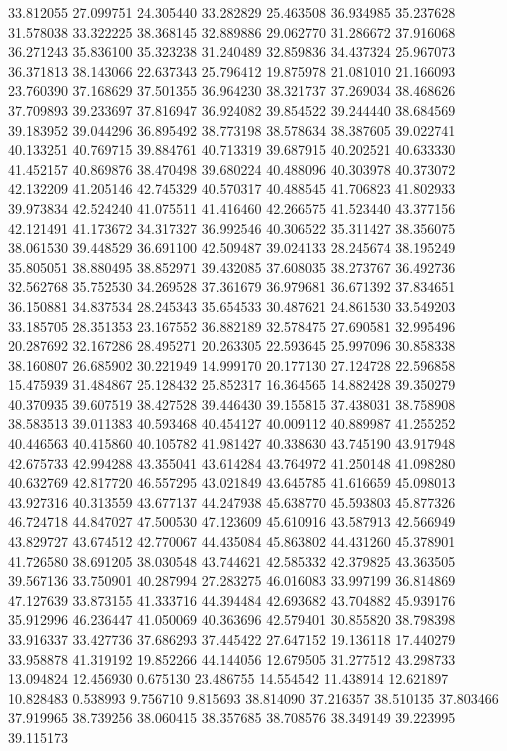 33.812055
27.099751
24.305440
33.282829
25.463508
36.934985
35.237628
31.578038
33.322225
38.368145
32.889886
29.062770
31.286672
37.916068
36.271243
35.836100
35.323238
31.240489
32.859836
34.437324
25.967073
36.371813
38.143066
22.637343
25.796412
19.875978
21.081010
21.166093
23.760390
37.168629
37.501355
36.964230
38.321737
37.269034
38.468626
37.709893
39.233697
37.816947
36.924082
39.854522
39.244440
38.684569
39.183952
39.044296
36.895492
38.773198
38.578634
38.387605
39.022741
40.133251
40.769715
39.884761
40.713319
39.687915
40.202521
40.633330
41.452157
40.869876
38.470498
39.680224
40.488096
40.303978
40.373072
42.132209
41.205146
42.745329
40.570317
40.488545
41.706823
41.802933
39.973834
42.524240
41.075511
41.416460
42.266575
41.523440
43.377156
42.121491
41.173672
34.317327
36.992546
40.306522
35.311427
38.356075
38.061530
39.448529
36.691100
42.509487
39.024133
28.245674
38.195249
35.805051
38.880495
38.852971
39.432085
37.608035
38.273767
36.492736
32.562768
35.752530
34.269528
37.361679
36.979681
36.671392
37.834651
36.150881
34.837534
28.245343
35.654533
30.487621
24.861530
33.549203
33.185705
28.351353
23.167552
36.882189
32.578475
27.690581
32.995496
20.287692
32.167286
28.495271
20.263305
22.593645
25.997096
30.858338
38.160807
26.685902
30.221949
14.999170
20.177130
27.124728
22.596858
15.475939
31.484867
25.128432
25.852317
16.364565
14.882428
39.350279
40.370935
39.607519
38.427528
39.446430
39.155815
37.438031
38.758908
38.583513
39.011383
40.593468
40.454127
40.009112
40.889987
41.255252
40.446563
40.415860
40.105782
41.981427
40.338630
43.745190
43.917948
42.675733
42.994288
43.355041
43.614284
43.764972
41.250148
41.098280
40.632769
42.817720
46.557295
43.021849
43.645785
41.616659
45.098013
43.927316
40.313559
43.677137
44.247938
45.638770
45.593803
45.877326
46.724718
44.847027
47.500530
47.123609
45.610916
43.587913
42.566949
43.829727
43.674512
42.770067
44.435084
45.863802
44.431260
45.378901
41.726580
38.691205
38.030548
43.744621
42.585332
42.379825
43.363505
39.567136
33.750901
40.287994
27.283275
46.016083
33.997199
36.814869
47.127639
33.873155
41.333716
44.394484
42.693682
43.704882
45.939176
35.912996
46.236447
41.050069
40.363696
42.579401
30.855820
38.798398
33.916337
33.427736
37.686293
37.445422
27.647152
19.136118
17.440279
33.958878
41.319192
19.852266
44.144056
12.679505
31.277512
43.298733
13.094824
12.456930
0.675130
23.486755
14.554542
11.438914
12.621897
10.828483
0.538993
9.756710
9.815693
38.814090
37.216357
38.510135
37.803466
37.919965
38.739256
38.060415
38.357685
38.708576
38.349149
39.223995
39.115173
